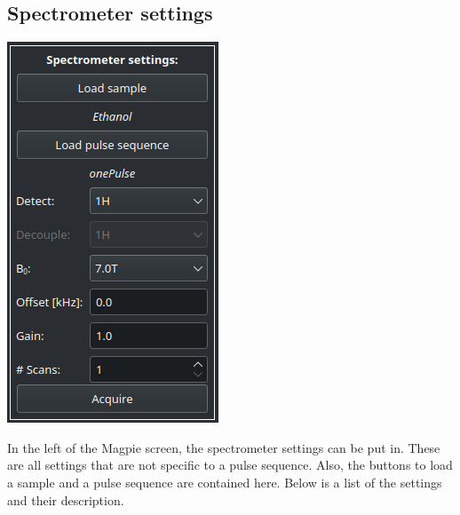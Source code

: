 \documentclass[11pt,a4paper]{article}
\begin{document}
\subsection{Spectrometer settings}


\begin{center}
\includegraphics[width=0.3\linewidth]{images/Spec_settings.png}
\end{center}
In the left of the Magpie screen, the spectrometer settings can be put in. These are all settings that are not specific to a pulse sequence. Also, the buttons to load a sample and a pulse sequence are contained here. Below is a list of the settings and their description.
\end{document}
